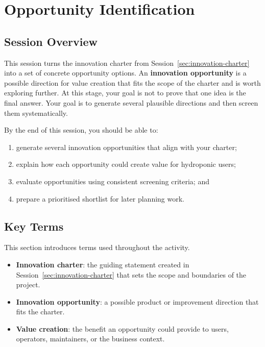 \chapter{Opportunity Identification}
\label{ch:opportunity-identification}

\section{Session Overview}

This session turns the innovation charter from Session~\ref{sec:innovation-charter} into a set of concrete opportunity options. An \textbf{innovation opportunity} is a possible direction for value creation that fits the scope of the charter and is worth exploring further. At this stage, your goal is not to prove that one idea is the final answer. Your goal is to generate several plausible directions and then screen them systematically.

By the end of this session, you should be able to:
\begin{enumerate}
    \item generate several innovation opportunities that align with your charter;
    \item explain how each opportunity could create value for hydroponic users;
    \item evaluate opportunities using consistent screening criteria; and
    \item prepare a prioritised shortlist for later planning work.
\end{enumerate}

\section{Key Terms}

This section introduces terms used throughout the activity.

\begin{itemize}
    \item \textbf{Innovation charter}: the guiding statement created in Session~\ref{sec:innovation-charter} that sets the scope and boundaries of the project.
    \item \textbf{Innovation opportunity}: a possible product or improvement direction that fits the charter.
    \item \textbf{Value creation}: the benefit an opportunity could provide to users, operators, maintainers, or the business context.
\end{itemize}

